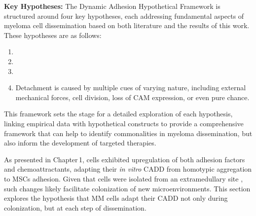 \newcommand{\caddtrigger}{%
      Detachment is caused by multiple cues of varying nature, including
      external mechanical forces, cell division, loss of \ac{CAM} expression, or
      even pure chance. }%
\newcommand{\caddtriggertitle}{ %
      \textit{Hypothesis 4}: Detachment is Caused by Multiple Cues of Varying
      Nature %
}%


\textbf{Key Hypotheses:}
The Dynamic Adhesion Hypothetical Framework is structured around four key
hypotheses, each addressing fundamental aspects of myeloma cell dissemination
based on both literature and the results of this work. These hypotheses are as
follows:

\begin{enumerate}[parsep=4pt]
      \item \caddadaptation
      \item \caddadaptibility
      \item \cadddiversity
      \item \caddtrigger
\end{enumerate}


This framework sets the stage for a detailed exploration of each hypothesis,
linking empirical data with hypothetical constructs to provide a comprehensive
framework that can help to identify commonalities in myeloma dissemination, but
also inform the development of targeted therapies.




\unnsubsection{\caddadaptationtitle}%
\label{sec:discussion_caddadaptation}%
As presented in Chapter\,1, \MAina cells exhibited upregulation of both adhesion
factors and chemoattractants, adapting their \textit{in vitro} \ac{CADD} from
homotypic aggregation to \acp{MSC} adhesion. Given that \INA cells were isolated
from an extramedullary site 
\cite{burgerGp130RasMediated2001}, such changes likely facilitate colonization
of new microenvironments. This section explores the hypothesis that MM cells
adapt their \ac{CADD} not only during colonization, but at each step of
dissemination.



